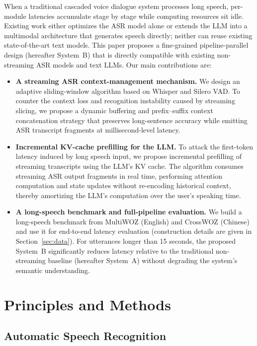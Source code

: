 \documentclass[conference]{IEEEtran}
\begin{document}
When a traditional cascaded voice dialogue system processes long speech, per-module latencies accumulate stage by stage while computing resources sit idle. Existing work either optimizes the ASR model alone or extends the LLM into a multimodal architecture that generates speech directly; neither can reuse existing state-of-the-art text models. This paper proposes a fine-grained pipeline-parallel design (hereafter System~B) that is directly compatible with existing non-streaming ASR models and text LLMs. Our main contributions are:

\begin{itemize}
\item \textbf{A streaming ASR context-management mechanism.} We design an adaptive sliding-window algorithm based on Whisper and Silero VAD. To counter the context loss and recognition instability caused by streaming slicing, we propose a dynamic buffering and prefix--suffix context concatenation strategy that preserves long-sentence accuracy while emitting ASR transcript fragments at millisecond-level latency.

\item \textbf{Incremental KV-cache prefilling for the LLM.} To attack the first-token latency induced by long speech input, we propose incremental prefilling of streaming transcripts using the LLM's KV cache. The algorithm consumes streaming ASR output fragments in real time, performing attention computation and state updates without re-encoding historical context, thereby amortizing the LLM's computation over the user's speaking time.

\item \textbf{A long-speech benchmark and full-pipeline evaluation.} We build a long-speech benchmark from MultiWOZ (English) and CrossWOZ (Chinese) and use it for end-to-end latency evaluation (construction details are given in Section~\ref{sec:data}). For utterances longer than 15 seconds, the proposed System~B significantly reduces latency relative to the traditional non-streaming baseline (hereafter System~A) without degrading the system's semantic understanding.
\end{itemize}

\section{Principles and Methods}\label{sec:methods}

\subsection{Automatic Speech Recognition}
\end{document}
